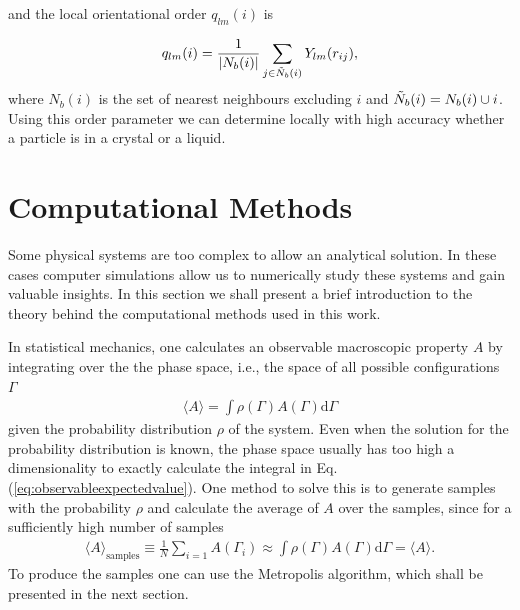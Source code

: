 and the local orientational order $q_{lm}(i)$ is

\begin{align}
    q_{lm}(i) = \frac{1}{|N_b(i)|} \displaystyle\sum_{j\in \Tilde{N}_b(i) } Y_{lm}(r_{ij}),
\end{align}
where $N_b(i)$ is the set of nearest neighbours excluding $i$ and $\Tilde{N}_b(i)=N_b(i) \cup {i}$. Using this order parameter we can determine  locally with high accuracy whether a particle is in a crystal or a liquid.



\section{Computational Methods}
\label{sec:compmethods}
Some physical systems are too complex to allow an analytical solution. In these cases computer simulations allow us to numerically study these systems and gain valuable insights. In this section we shall present a brief introduction to the theory behind the computational methods used in this work.

In statistical mechanics, one calculates an observable macroscopic property $A$ by integrating over the the phase space, i.e., the space of all possible configurations $\Gamma$
\begin{align}
\label{eq:observableexpectedvalue}
\langle A\rangle = \int \rho\left(\Gamma\right)  A\left(\Gamma\right) \mathrm{d}\Gamma
\end{align}
given the probability distribution $\rho$ of the system. Even when the solution for the probability distribution is known, the phase space usually has too high a dimensionality to exactly calculate the integral in Eq.(\ref{eq:observableexpectedvalue}). One method to solve this is to generate samples with the probability $\rho$ and calculate the average of $A$ over the samples, since for a sufficiently high number of samples
\begin{align*}
    \langle A\rangle_{\text{samples}}\equiv\frac{1}{N} \displaystyle\sum_{i=1}A(\Gamma_i) \approx \int \rho\left(\Gamma\right)  A\left(\Gamma\right) \mathrm{d}\Gamma =\langle A\rangle.
\end{align*}
To produce the samples one can use the Metropolis algorithm, which shall be presented in the next section.

